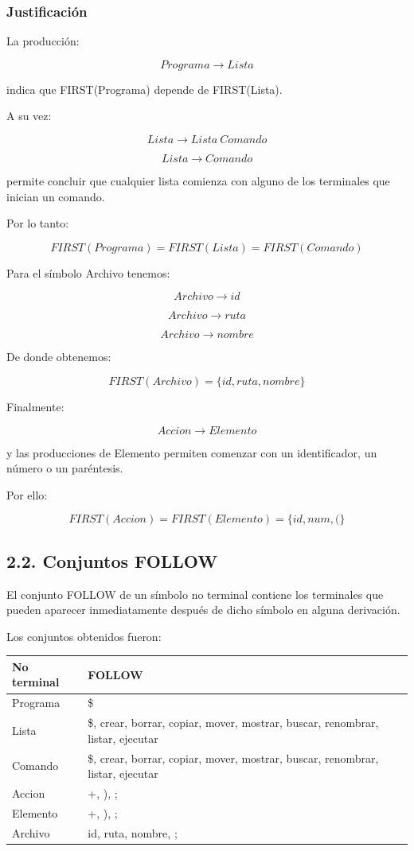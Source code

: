 \documentclass[11pt,letterpaper]{article}
\begin{document}
\subsubsection*{Justificación}

La producción:

\[
Programa \rightarrow Lista
\]

indica que FIRST(Programa) depende de FIRST(Lista).

A su vez:

\[
Lista \rightarrow Lista\ Comando
\]

\[
Lista \rightarrow Comando
\]

permite concluir que cualquier lista comienza
con alguno de los terminales que inician un comando.

Por lo tanto:

\[
FIRST(Programa)=FIRST(Lista)=FIRST(Comando)
\]

Para el símbolo Archivo tenemos:

\[
Archivo \rightarrow id
\]

\[
Archivo \rightarrow ruta
\]

\[
Archivo \rightarrow nombre
\]

De donde obtenemos:

\[
FIRST(Archivo)=\{id,ruta,nombre\}
\]

Finalmente:

\[
Accion \rightarrow Elemento
\]

y las producciones de Elemento permiten comenzar
con un identificador, un número o un paréntesis.

Por ello:

\[
FIRST(Accion)=FIRST(Elemento)=\{id,num,(\}
\]


\subsection*{2.2. Conjuntos FOLLOW}

El conjunto FOLLOW de un símbolo no terminal contiene
los terminales que pueden aparecer inmediatamente
después de dicho símbolo en alguna derivación.

Los conjuntos obtenidos fueron:

\begin{center}
\begin{tabular}{|l|p{10cm}|}
\hline
\textbf{No terminal} & \textbf{FOLLOW} \\ \hline
Programa & \$ \\ \hline
Lista &
\$, crear, borrar, copiar, mover, mostrar,
buscar, renombrar, listar, ejecutar \\ \hline
Comando &
\$, crear, borrar, copiar, mover, mostrar,
buscar, renombrar, listar, ejecutar \\ \hline
Accion & +, ), ; \\ \hline
Elemento & +, ), ; \\ \hline
Archivo & id, ruta, nombre, ; \\ \hline
\end{tabular}
\end{center}
\end{document}
